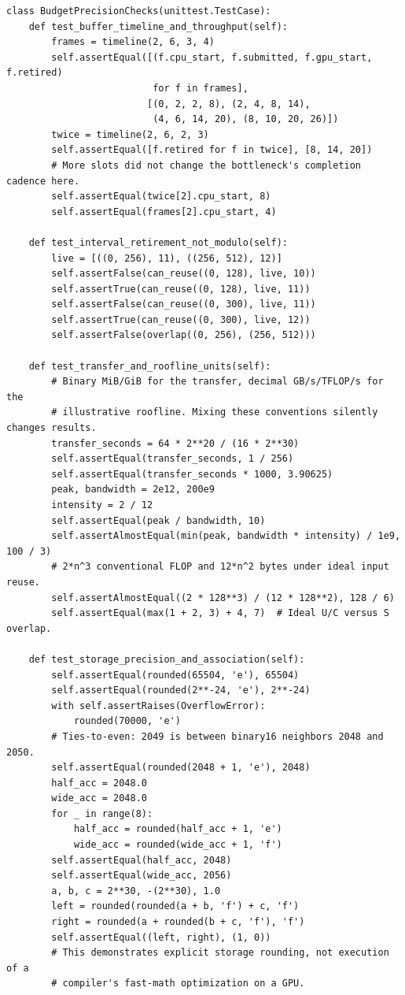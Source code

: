 \begin{verbatim}
class BudgetPrecisionChecks(unittest.TestCase):
    def test_buffer_timeline_and_throughput(self):
        frames = timeline(2, 6, 3, 4)
        self.assertEqual([(f.cpu_start, f.submitted, f.gpu_start, f.retired)
                          for f in frames],
                         [(0, 2, 2, 8), (2, 4, 8, 14),
                          (4, 6, 14, 20), (8, 10, 20, 26)])
        twice = timeline(2, 6, 2, 3)
        self.assertEqual([f.retired for f in twice], [8, 14, 20])
        # More slots did not change the bottleneck's completion cadence here.
        self.assertEqual(twice[2].cpu_start, 8)
        self.assertEqual(frames[2].cpu_start, 4)

    def test_interval_retirement_not_modulo(self):
        live = [((0, 256), 11), ((256, 512), 12)]
        self.assertFalse(can_reuse((0, 128), live, 10))
        self.assertTrue(can_reuse((0, 128), live, 11))
        self.assertFalse(can_reuse((0, 300), live, 11))
        self.assertTrue(can_reuse((0, 300), live, 12))
        self.assertFalse(overlap((0, 256), (256, 512)))

    def test_transfer_and_roofline_units(self):
        # Binary MiB/GiB for the transfer, decimal GB/s/TFLOP/s for the
        # illustrative roofline. Mixing these conventions silently changes results.
        transfer_seconds = 64 * 2**20 / (16 * 2**30)
        self.assertEqual(transfer_seconds, 1 / 256)
        self.assertEqual(transfer_seconds * 1000, 3.90625)
        peak, bandwidth = 2e12, 200e9
        intensity = 2 / 12
        self.assertEqual(peak / bandwidth, 10)
        self.assertAlmostEqual(min(peak, bandwidth * intensity) / 1e9, 100 / 3)
        # 2*n^3 conventional FLOP and 12*n^2 bytes under ideal input reuse.
        self.assertAlmostEqual((2 * 128**3) / (12 * 128**2), 128 / 6)
        self.assertEqual(max(1 + 2, 3) + 4, 7)  # Ideal U/C versus S overlap.

    def test_storage_precision_and_association(self):
        self.assertEqual(rounded(65504, 'e'), 65504)
        self.assertEqual(rounded(2**-24, 'e'), 2**-24)
        with self.assertRaises(OverflowError):
            rounded(70000, 'e')
        # Ties-to-even: 2049 is between binary16 neighbors 2048 and 2050.
        self.assertEqual(rounded(2048 + 1, 'e'), 2048)
        half_acc = 2048.0
        wide_acc = 2048.0
        for _ in range(8):
            half_acc = rounded(half_acc + 1, 'e')
            wide_acc = rounded(wide_acc + 1, 'f')
        self.assertEqual(half_acc, 2048)
        self.assertEqual(wide_acc, 2056)
        a, b, c = 2**30, -(2**30), 1.0
        left = rounded(rounded(a + b, 'f') + c, 'f')
        right = rounded(a + rounded(b + c, 'f'), 'f')
        self.assertEqual((left, right), (1, 0))
        # This demonstrates explicit storage rounding, not execution of a
        # compiler's fast-math optimization on a GPU.


\end{verbatim}
